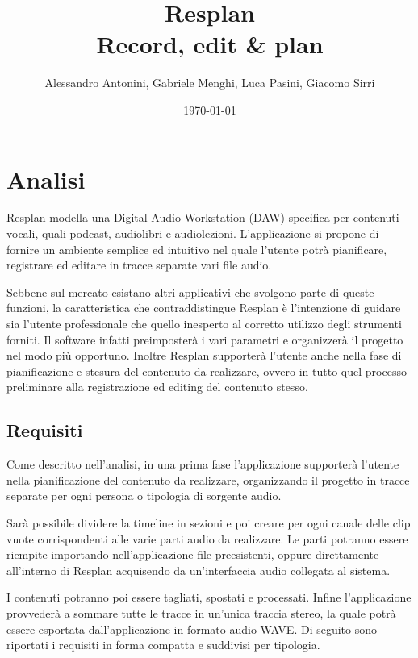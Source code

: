 \documentclass[a4paper,12pt]{report}
\title{Resplan \\ \large Record, edit \& plan}
\author{Alessandro Antonini, Gabriele Menghi, Luca Pasini, Giacomo Sirri}
\date{\today}
\begin{document}
\maketitle

\tableofcontents

\chapter{Analisi}

Resplan modella una Digital Audio Workstation (DAW) specifica per contenuti vocali, quali podcast, audiolibri e audiolezioni.
L’applicazione si propone di fornire un ambiente semplice ed intuitivo nel quale l’utente potrà pianificare, registrare ed editare in tracce separate vari file audio.

Sebbene sul mercato esistano altri applicativi che svolgono parte di queste funzioni, la caratteristica che contraddistingue Resplan è l’intenzione di guidare sia l’utente professionale che quello inesperto al corretto utilizzo degli strumenti forniti. Il software infatti preimposterà i vari parametri e organizzerà il progetto nel modo più opportuno. Inoltre Resplan supporterà l’utente anche nella fase di pianificazione e stesura del contenuto da realizzare, ovvero in tutto quel processo preliminare alla registrazione ed editing del contenuto stesso.


\section{Requisiti}

Come descritto nell’analisi, in una prima fase l’applicazione supporterà l’utente nella pianificazione del contenuto da realizzare, organizzando il progetto in tracce separate per ogni persona o tipologia di sorgente audio.

Sarà possibile dividere la timeline in sezioni e poi creare per ogni canale delle clip vuote corrispondenti alle varie parti audio da realizzare.
Le parti potranno essere riempite importando nell’applicazione file preesistenti, oppure direttamente all’interno di Resplan acquisendo da un'interfaccia audio collegata al sistema.

I contenuti potranno poi essere tagliati, spostati e processati.
Infine l’applicazione provvederà a sommare tutte le tracce in un’unica traccia stereo, la quale potrà essere esportata dall’applicazione in formato audio WAVE.
Di seguito sono riportati i requisiti in forma compatta e suddivisi per tipologia.
\end{document}
